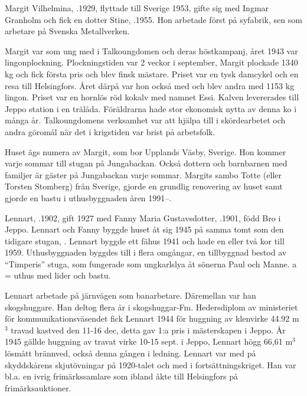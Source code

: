 
%
Margit Vilhelmina, .1929, flyttade till Sverige 1953, gifte sig med Ingmar Granholm och fick en dotter Stine, .1955. Hon arbetade först på syfabrik, sen som arbetare på Svenska Metallverken.

Margit var som ung med i Talkoungdomen och deras höstkampanj, året 1943 var lingonplockning. Plockningstiden var 2 veckor i september, Margit plockade 1340 kg och fick första pris och blev finsk mästare. Priset var en tysk damcykel och en resa till Helsingfors. Året därpå var hon också med och blev andra med 1153 kg lingon. Priset var en hornlös röd kokalv med namnet Essi. Kalven levererades till Jeppo station i en trälåda. Föräldrarna hade stor ekonomisk nytta av denna ko i många år. Talkoungdomens verksamhet var att hjälpa till i skördearbetet och andra göromål när det i krigstiden var brist på arbetsfolk.

Huset ägs numera av Margit, som bor Upplands Väsby, Sverige. Hon kommer varje sommar till stugan på Jungabackan. Också dottern och barnbarnen med familjer är gäster på Jungabackan varje sommar. Margits sambo Totte (eller Torsten Stomberg)  från Sverige, gjorde en grundlig renovering av huset samt gjorde en bastu i uthusbyggnaden åren 1991--.



%
Lennart, .1902, gift 1927 med Fanny Maria Gustavsdotter, .1901, född Bro i Jeppo. Lennart och Fanny byggde huset åt sig 1945 på samma tomt som den tidigare stugan, . Lennart byggde ett fähus 1941 och hade en eller två kor till 1959. Uthusbyggnaden byggdes till i flera omgångar, en tillbyggnad bestod av ``Timperis'' stuga, som fungerade som ungkarlslya åt sönerna Paul och Manne. a = uthus med lider och bastu.

Lennart arbetade på järnvägen som banarbetare. Däremellan var han skogshuggare. Han deltog flera år i skogshuggar-Fm. Hedersdiplom av ministeriet för kommunikationsväsendet fick Lennart 1944 för huggning av klenvirke 44.92 m$^3$ travad kastved den 11-16 dec, detta gav 1:a pris i mästerskapen i Jeppo. År 1945 gällde huggning av travat virke 10-15 sept. i Jeppo, Lennart högg 66,61 m$^3$ lösmått brännved, också denna gången i ledning. Lennart var med på skyddskårens skjutövningar på 1920-talet och med i fortsättningskriget. Han var bl.a. en ivrig frimärkssamlare som ibland åkte till Helsingfors på frimärksauktioner.

